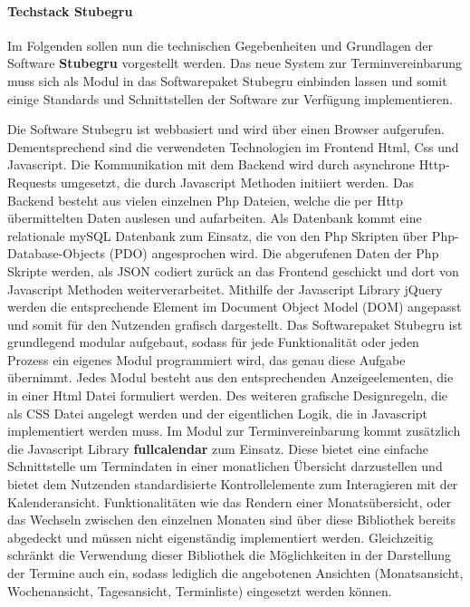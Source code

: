 \documentclass[12pt]{article}
\begin{document}
\paragraph{Techstack Stubegru}
Im Folgenden sollen nun die technischen Gegebenheiten und Grundlagen der
Software \textbf{Stubegru} vorgestellt werden. Das neue System zur
Terminvereinbarung muss sich als Modul in das Softwarepaket Stubegru einbinden
lassen und somit einige Standards und Schnittstellen der Software zur Verfügung
implementieren.

Die Software Stubegru ist webbasiert und wird über einen Browser aufgerufen.
Dementsprechend sind die verwendeten Technologien im Frontend Html, Css und
Javascript. Die Kommunikation mit dem Backend wird durch asynchrone
Http-Requests umgesetzt, die durch Javascript Methoden initiiert werden. Das
Backend besteht aus vielen einzelnen Php Dateien, welche die per Http
übermittelten Daten auslesen und aufarbeiten. Als Datenbank kommt eine
relationale mySQL Datenbank zum Einsatz, die von den Php Skripten über
Php-Database-Objects (PDO) angesprochen wird. Die abgerufenen Daten der Php
Skripte werden, als JSON codiert zurück an das Frontend geschickt und dort von
Javascript Methoden weiterverarbeitet. Mithilfe der Javascript Library jQuery
werden die entsprechende Element im Document Object Model (DOM) angepasst und
somit für den Nutzenden grafisch dargestellt. Das Softwarepaket Stubegru ist
grundlegend modular aufgebaut, sodass für jede Funktionalität oder jeden
Prozess ein eigenes Modul programmiert wird, das genau diese Aufgabe übernimmt.
Jedes Modul besteht aus den entsprechenden Anzeigeelementen, die in einer Html
Datei formuliert werden. Des weiteren grafische Designregeln, die als CSS Datei
angelegt werden und der eigentlichen Logik, die in Javascript implementiert
werden muss. Im Modul zur Terminvereinbarung kommt zusätzlich die Javascript
Library \textbf{fullcalendar} zum Einsatz. Diese bietet eine einfache
Schnittstelle um Termindaten in einer monatlichen Übersicht darzustellen und
bietet dem Nutzenden standardisierte Kontrollelemente zum Interagieren mit der
Kalenderansicht. Funktionalitäten wie das Rendern einer Monatsübersicht, oder
das Wechseln zwischen den einzelnen Monaten sind über diese Bibliothek bereits
abgedeckt und müssen nicht eigenständig implementiert werden. Gleichzeitig
schränkt die Verwendung dieser Bibliothek die Möglichkeiten in der Darstellung
der Termine auch ein, sodass lediglich die angebotenen Ansichten
(Monatsansicht, Wochenansicht, Tagesansicht, Terminliste) eingesetzt werden
können.
\end{document}
